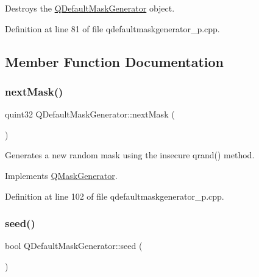 Destroys the \mbox{\hyperlink{class_q_default_mask_generator}{Q\+Default\+Mask\+Generator}} object. 

Definition at line 81 of file qdefaultmaskgenerator\+\_\+p.\+cpp.



\subsection{Member Function Documentation}
\mbox{\label{class_q_default_mask_generator_a1dde10b93e9e5c484cf15cfced080226}} 
\subsubsection{\texorpdfstring{next\+Mask()}{nextMask()}}
{\footnotesize\ttfamily quint32 Q\+Default\+Mask\+Generator\+::next\+Mask (\begin{DoxyParamCaption}{ }\end{DoxyParamCaption})\hspace{0.3cm}{\ttfamily [virtual]}}

Generates a new random mask using the insecure qrand() method. 

Implements \mbox{\hyperlink{class_q_mask_generator_aff3309c2b67cfd4ae6e0cba615e9d4dd}{Q\+Mask\+Generator}}.



Definition at line 102 of file qdefaultmaskgenerator\+\_\+p.\+cpp.

\mbox{\label{class_q_default_mask_generator_a0ee0187ffa93deb9e30d96f4c560a48d}} 
\subsubsection{\texorpdfstring{seed()}{seed()}}
{\footnotesize\ttfamily bool Q\+Default\+Mask\+Generator\+::seed (\begin{DoxyParamCaption}{ }\end{DoxyParamCaption})\hspace{0.3cm}{\ttfamily [virtual]}}


